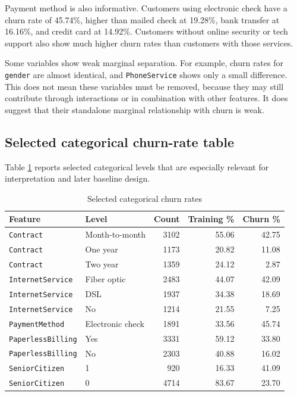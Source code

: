 Payment method is also informative. Customers using electronic check have a churn rate of 45.74\%, higher than mailed check at 19.28\%, bank transfer at 16.16\%, and credit card at 14.92\%. Customers without online security or tech support also show much higher churn rates than customers with those services.

Some variables show weak marginal separation. For example, churn rates for \texttt{gender} are almost identical, and \texttt{PhoneService} shows only a small difference. This does not mean these variables must be removed, because they may still contribute through interactions or in combination with other features. It does suggest that their standalone marginal relationship with churn is weak.

\subsection{Selected categorical churn-rate table}

Table \ref{tab:selected-categorical-churn-rates} reports selected categorical levels that are especially relevant for interpretation and later baseline design.

\begin{table}[H]
\centering
\caption{Selected categorical churn rates}
\label{tab:selected-categorical-churn-rates}
\begin{tabular}{llrrr}
\toprule
Feature & Level & Count & Training \% & Churn \% \\
\midrule
\texttt{Contract} & Month-to-month & 3102 & 55.06 & 42.75 \\
\texttt{Contract} & One year & 1173 & 20.82 & 11.08 \\
\texttt{Contract} & Two year & 1359 & 24.12 & 2.87 \\
\texttt{InternetService} & Fiber optic & 2483 & 44.07 & 42.09 \\
\texttt{InternetService} & DSL & 1937 & 34.38 & 18.69 \\
\texttt{InternetService} & No & 1214 & 21.55 & 7.25 \\
\texttt{PaymentMethod} & Electronic check & 1891 & 33.56 & 45.74 \\
\texttt{PaperlessBilling} & Yes & 3331 & 59.12 & 33.80 \\
\texttt{PaperlessBilling} & No & 2303 & 40.88 & 16.02 \\
\texttt{SeniorCitizen} & 1 & 920 & 16.33 & 41.09 \\
\texttt{SeniorCitizen} & 0 & 4714 & 83.67 & 23.70 \\
\bottomrule
\end{tabular}
\end{table}


